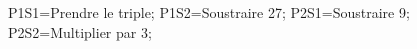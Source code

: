 \documentclass[exercice]{thedocument}%
\begin{document}
%
    \>P1S1=Prendre le triple;%
    \>P1S2=Soustraire 27;%
    \>P2S1=Soustraire 9;%
    \>P2S2=Multiplier par 3;%
\end{document}
